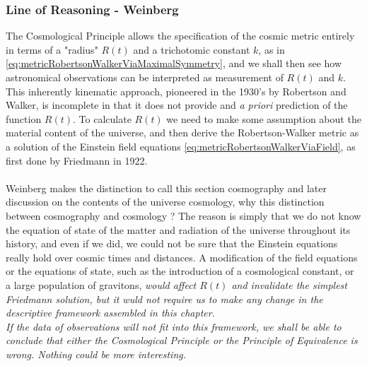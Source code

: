 \subsubsection{Line of Reasoning - Weinberg}
The Cosmological Principle allows the specification of the cosmic metric entirely in terms of a "radius" $R(t)$ and a trichotomic constant $k$, as in \ref{eq:metricRobertsonWalkerViaMaximalSymmetry}, and we shall then see how astronomical observations can be interpreted as measurement of $R(t)$ and $k$.\\
This inherently kinematic approach, pioneered in the 1930's by Robertson and Walker, is incomplete in that it does not provide and \emph{a priori} prediction of the function $R(t)$. To calculate $R(t)$ we need to make some assumption about the material content of the universe, and then derive the Robertson-Walker metric as a solution of the Einstein field equations \ref{eq:metricRobertsonWalkerViaField}, as first done by Friedmann in 1922.\\
\\
Weinberg makes the distinction to call this section cosmography and later discussion on the contents of the universe cosmology, why this distinction between cosmography and cosmology ? The reason is simply that we do not know the equation of state of the matter and radiation of the universe throughout its history, and even if we did, we could not be sure that the Einstein equations really hold over cosmic times and distances. A modification of the field equations or the equations of state, such as the introduction of a cosmological constant, or a large population of gravitons, \emph{would affect $R(t)$ and invalidate the simplest Friedmann solution, but it wuld not require us to make any change in the descriptive framework assembled in this chapter}.\\
\emph{If the data of observations will not fit into this framework, we shall be able to conclude that either the Cosmological Principle or the Principle of Equivalence is wrong. Nothing could be more interesting.}








